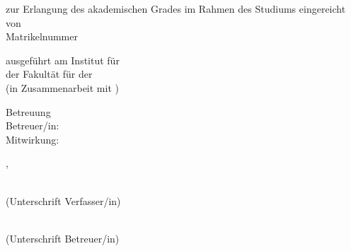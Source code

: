 \begin{titlepage}
\begin{center}
    \vspace{2.25cm}

    \begin{minipage}[t][0.22\paperheight]{\textwidth}
      \centering
      zur Erlangung des akademischen Grades
      \vfill
      {\Large \textbf{\thesisdegree}}
      \vfill
      im Rahmen des Studiums
      \vfill
      {\Large\textbf{\thesisstudies}}
      \vfill
      eingereicht von
      \vfill
      {\Large\textbf{\thesisauthor}}\\[1mm]
      Matrikelnummer~\thesisstudentnumber
    \end{minipage}
               
  \end{center}

  \vfill

  \noindent ausgef\"{u}hrt am Institut f\"{u}r \thesisinstitute\\
  der Fakult\"{a}t f\"{u}r \thesisfaculty{} der \thesisuniversity\\
  (in Zusammenarbeit mit \thesiscollaboration{})

  \vspace{0.6cm}

  \noindent Betreuung\\
  Betreuer/in: \thesissupervisor{}\\
  Mitwirkung: \thesiscosupervisor{}

  \vspace{1.1cm}
  \noindent \thesisplace{}, \thesisdate \hspace{1cm}%
  \begin{minipage}[t]{5cm}%
    \flushleft%
    \hrulefill\\ (Unterschrift Verfasser/in)%
  \end{minipage}%
  \hspace{1cm}%
  \begin{minipage}[t]{5cm}
    \flushleft%
    \hrulefill\\ (Unterschrift Betreuer/in)%
  \end{minipage}
    
  \endgroup
  
\end{titlepage}
